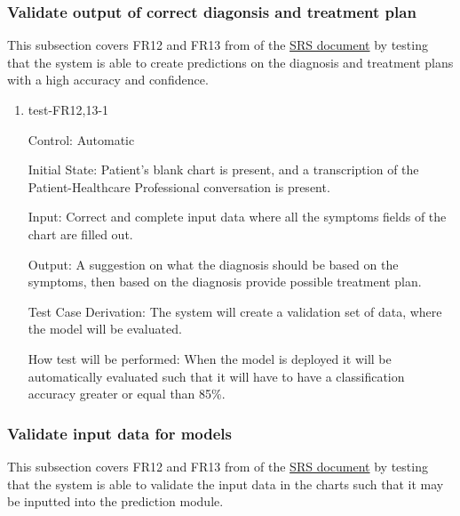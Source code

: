 \documentclass[12pt, titlepage]{article}
\begin{document}
\subsubsection{Validate output of correct diagonsis and treatment plan} \label{section:4.1.6}

This subsection covers FR12 and FR13 from of the \href{https://github.com/Inreet-Kaur/capstone/blob/main/docs/SRS/SRS.pdf} {SRS document} by testing that the system is able to create predictions on the diagnosis and treatment plans with a high accuracy and confidence.

\begin{enumerate}

\item{test-FR12,13-1} \label{test-FR12,13-1}

Control: Automatic

Initial State: Patient's blank chart is present, and a transcription of the Patient-Healthcare Professional conversation is present.

Input: Correct and complete input data where all the symptoms fields of the chart are filled out.

Output: A suggestion on what the diagnosis should be based on the symptoms, then based on the diagnosis provide possible treatment plan.

Test Case Derivation: The system will create a validation set of data, where the model will be evaluated. 

How test will be performed: When the model is deployed it will be automatically evaluated such that it will have to have a classification accuracy greater or equal than 85\%.

\end{enumerate}


\subsubsection{Validate input data for models} \label{section:4.1.7}
This subsection covers FR12 and FR13 from of the \href{https://github.com/Inreet-Kaur/capstone/blob/main/docs/SRS/SRS.pdf} {SRS document} by testing that the system is able to validate the input data in the charts such that it may be inputted into the prediction module.
\end{document}
